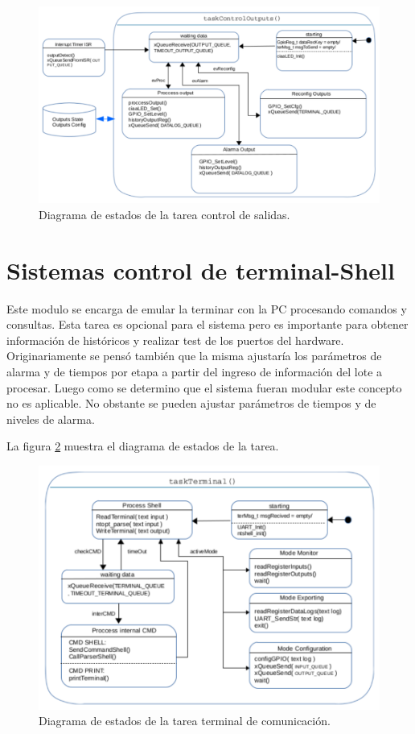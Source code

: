 \begin{figure}[h!]
	\centering
	\includegraphics[width=1.2\textwidth]{Figures/Cap_3/diagrama_tarea_output}
	\caption{ Diagrama de estados de la tarea control de salidas. }
	\label{fig:diag_TareasOut}
\end{figure}

\section{ Sistemas control de terminal-Shell }
Este modulo se encarga de emular la terminar con la PC procesando comandos y consultas. Esta tarea es opcional para el sistema pero es importante para obtener información de históricos y realizar test de los puertos del hardware. 
Originariamente se pensó también que la misma ajustaría los parámetros de alarma y de tiempos por etapa a partir del ingreso de información del lote a procesar. Luego como se determino que el sistema fueran modular este concepto no es aplicable. No obstante se pueden ajustar parámetros de tiempos y de niveles de alarma.

La figura \ref{fig:diag_TareasShell} muestra el diagrama de estados de la tarea.
\begin{figure}[h!]
	\centering
	\includegraphics[width=1.2\textwidth]{Figures/Cap_3/diagrama_tarea_terminal}
	\caption{ Diagrama de estados de la tarea terminal de comunicación. }
	\label{fig:diag_TareasShell}
\end{figure}

